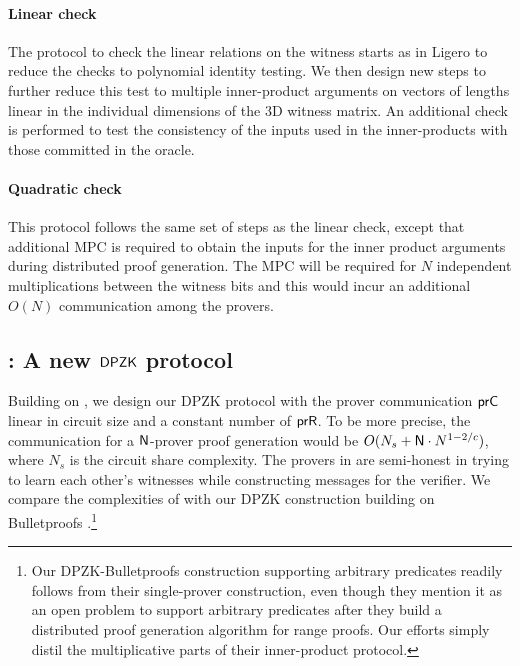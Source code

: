\paragraph{Linear check} The protocol to check the linear relations on the witness starts as in Ligero to reduce the checks to polynomial identity testing. We then design new steps to further reduce this test to multiple inner-product arguments on vectors of lengths linear in the individual dimensions of the 3D witness matrix. An additional check is performed to test the consistency of the inputs used in the inner-products with those committed in the oracle.
\paragraph{Quadratic check} This protocol follows the same set of steps as the linear check, except that additional MPC is required to obtain the inputs for the inner product arguments during distributed proof generation. The MPC will be required for $N$ independent multiplications between the witness bits and this would incur an additional $O(N)$ communication among the provers.  

\subsection{\dpname: A new $\mathsf{DPZK}$ protocol}
Building on \name{}, we design our DPZK protocol \dpname{} with the prover communication $\mathsf{prC}$ linear in circuit size and a constant number of $\mathsf{prR}$. To be more precise, the communication for a $\mathsf{N}$-prover proof generation would be $O(N_s + \mathsf{N} \cdot N^{1-2/c})$, where $N_s$ is the circuit share complexity. The provers in \dpname{} are semi-honest in trying to learn each other's witnesses while constructing messages for the verifier. We compare the complexities of \dpname{} with our DPZK construction building on Bulletproofs \cite{bulletproofs}.\footnote{Our DPZK-Bulletproofs construction supporting arbitrary predicates readily follows from their single-prover construction, even though they mention it as an open problem to support arbitrary predicates after they build a distributed proof generation algorithm for range proofs. Our efforts simply distil the multiplicative parts of their inner-product protocol. } 


